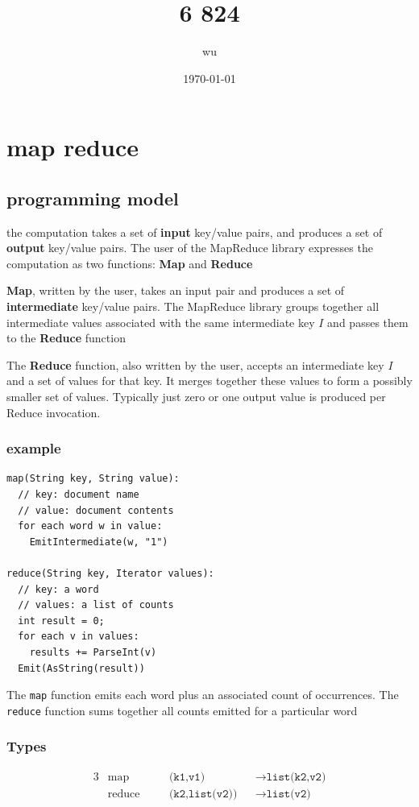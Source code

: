 \documentclass[11pt]{article}
\author{wu}
\date{\today}
\title{6 824}
\begin{document}
\maketitle
\tableofcontents


\section{map reduce}
\label{sec:orgec9e8b2}

\subsection{programming model}
\label{sec:orgd3308cf}
the computation takes a set of \textbf{input} key/value pairs, and produces a set of \textbf{output} key/value
pairs. The user of the MapReduce library expresses the computation as two functions: \textbf{Map} and
\textbf{Reduce}

\textbf{Map}, written by the user, takes an input pair and produces a set of \textbf{intermediate} key/value
pairs. The MapReduce library groups together all intermediate values associated with the same
intermediate key \(I\) and passes them to the \textbf{Reduce} function

The \textbf{Reduce} function, also written by the user, accepts an intermediate key \(I\)  and a set of
values for that key. It merges together these values to form a possibly smaller set of values.
Typically just zero or one output value is produced per Reduce invocation.

\subsubsection{example}
\label{sec:orgd0217e6}
\begin{verbatim}
map(String key, String value):
  // key: document name
  // value: document contents
  for each word w in value:
    EmitIntermediate(w, "1")

reduce(String key, Iterator values):
  // key: a word
  // values: a list of counts
  int result = 0;
  for each v in values:
    results += ParseInt(v)
  Emit(AsString(result))
\end{verbatim}
The \texttt{map} function emits each word plus an associated count of occurrences. The \texttt{reduce} function
sums together all counts emitted for a particular word

\subsubsection{Types}
\label{sec:orgef673b6}
\begin{alignat*}{3}
&\text{map}&&\texttt{(k1,v1)}&&\to\texttt{list(k2,v2)}\\
&\text{reduce}\quad&&\texttt{(k2,list(v2))}&&\to\texttt{list(v2)}\\
\end{alignat*}
\end{document}
